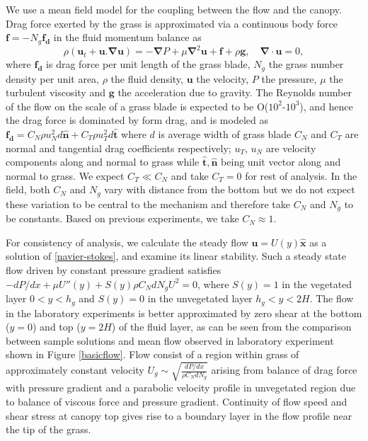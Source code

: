 \documentclass[aps,prl,reprint,twocolumn,showpacs,superscriptaddress,10pt]{revtex4-1}  %
\newcommand{\bn}{{\boldsymbol{\hat{n}}}}
\newcommand{\bt}{{\boldsymbol{\hat{t}}}}
\newcommand{\bu}{\mathbf{u}}
\newcommand{\grad}{\mathbf{\nabla}}
\newcommand{\hg}{h_g}
\newcommand{\shreyas}[1]{}
\begin{document}
We use a mean field model for the coupling between the flow and the canopy. 
Drag force exerted by the grass is approximated via a continuous body force $\mathbf{f}=-N_g\mathbf{f_d}$ in the fluid momentum balance\cite{Vivoni98,Nepf99,Ghisal02,Delangre04,Delangre06} as
\begin{equation}
\rho \left(\bu_{t}+\bu.\grad\bu \right) = -\grad P+\mu\grad^{2}\bu +\mathbf{f}+\rho\mathbf{g}, \quad \grad\cdot\bu = 0,
\label{navier-stokes}
\end{equation}
where $\mathbf{f_{d}}$ is drag force per unit length of the grass blade, $N_g$ the grass number density per unit area, $\rho$ the fluid density, $\mathbf{u}$ the velocity, 
$P$ the pressure, $\mu$ the turbulent viscosity and $\mathbf{g}$ the acceleration due to gravity. 
The Reynolds number of the flow on the scale of a grass blade is expected to be O($10^2$-$10^3$), and hence the drag force is dominated by form drag, and is modeled as 
$\mathbf{f_{d}}=C_N \rho u_{N}^{2}d\bn + C_{T}\rho u_{T}^{2}d\bt$ \shreyas{citation needed} 
where $d$ is average width of grass blade $C_{N}$ and $C_{T}$ are normal and tangential drag coefficients respectively; $u_{T}$, $u_{N}$ are velocity components along and
normal to grass while $\bt,\bn$ being unit vector along and normal to grass. 
We expect $C_T \ll C_N$ and take $C_T=0$ for rest of analysis. 
In the field, both $C_N$ and $N_g$ vary with distance from the bottom but we do not expect these variation to be central to the mechanism and therefore take $C_N$ and $N_g$ to be constants. 
Based on previous experiments\cite{Vivoni98}, we take $C_N \approx 1$.

For consistency of analysis, we calculate the steady flow $\bu = U(y)\boldsymbol{\hat{x}}$ as a solution of \eqref{navier-stokes}, and examine its linear stability. 
Such a steady state flow driven by constant pressure gradient satisfies $-{dP}/{dx}+\mu U''(y) +S(y) \rho C_N d N_gU^2=0$, where $S(y)=1$ in the vegetated layer $0<y<\hg$ and $S(y)=0$ in the unvegetated layer $\hg< y< 2H$.
The flow in the laboratory experiments is better approximated by zero shear at the bottom ($y=0$) and top ($y=2H$) of the fluid layer, as can be seen from the comparison between sample solutions and mean flow observed in laboratory experiment shown in Figure \ref{basicflow}. 
Flow consist of a region within grass of approximately constant velocity $U_g \sim \sqrt{\frac{dP/dx}{\rho C_N dN_g}}$ arising from balance of drag force with pressure gradient and a parabolic velocity profile in unvegetated region due to balance of viscous force and pressure gradient. 
Continuity of flow speed and shear stress at canopy top gives rise to a boundary layer in the flow profile near the tip of the grass. 
\end{document}
